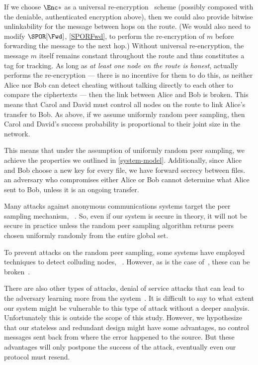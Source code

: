 If we choose \(\Enc*\) as a universal re-encryption~\cite{UniversalReencryption} 
scheme (possibly composed with the deniable, authenticated encryption above), 
then we could also provide bitwise unlinkability for the message between hops on 
the route.
(We would also need to modify \(\SPOR[\Fwd]\), \cref{SPORFwd}, to perform the 
re-encryption of \(m\) before forwarding the message to the next hop.)
Without universal re-encryption, the message \(m\) itself remains constant 
throughout the route and thus constitutes a tag for tracking.
As long as \emph{at least one node on the route is honest}, \ie actually 
performs the re-encryption --- there is no incentive for them to do this, as 
neither Alice nor Bob can detect cheating without talking directly to each other 
to compare the ciphertexts --- then the link between Alice and Bob is broken.
This means that Carol and David must control all nodes on the route to link 
Alice's transfer to Bob.
As above, if we assume uniformly random peer sampling, then Carol and David's 
success probability is proportional to their joint size in the network.

This means that under the assumption of uniformly random peer sampling, we 
achieve the properties we outlined in \cref{system-model}.
Additionally, since Alice and Bob choose a new key for every file, we have 
forward secrecy between files.
\Eg an adversary who compromises either Alice or Bob cannot determine what Alice 
sent to Bob, unless it is an ongoing transfer.
\\
\label{security-limitations}

Many attacks against anonymous communications systems target the peer sampling 
mechanism, \eg~\cite{%
  RouteFingerprinting,%
  EpistemicAttacksOnRouteSelection,%
}.
So, even if our system is secure in theory, it will not be secure in practice 
unless the random peer sampling algorithm returns peers chosen uniformly 
randomly from the entire global set. %

To prevent attacks on the random peer sampling, some systems have employed 
techniques to detect colluding nodes, \eg~\cite{%
  SecurePeerSampling,%
  MorphMix,%
}.
However, as is the case of~\cite{MorphMix}, these can be 
broken~\cite{BreakingMorphMix}.

There are also other types of attacks, \eg denial of service attacks that can 
lead to the adversary learning more from the system~\cite{DenialOfSecurity}.
It is difficult to say to what extent our system might be vulnerable to this 
type of attack without a deeper analysis.
Unfortunately this is outside the scope of this study.
However, we hypothesize that our stateless and redundant design might have some 
advantages, \eg no control messages sent back from where the error happened to 
the source.
But these advantages will only postpone the success of the attack, eventually 
even our protocol must resend.


